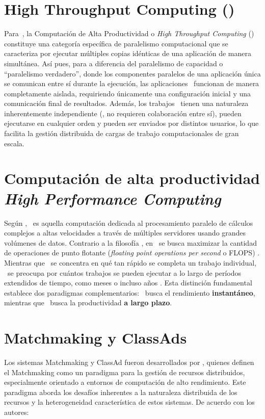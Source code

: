 \section{High Throughput Computing (\HTC)}
\noindent
Para~\cite{Morgan2009}, la Computación de Alta Productividad o \textit{High Throughput Computing} (\HTC) constituye una categoría específica de paralelismo computacional que se caracteriza por ejecutar múltiples copias idénticas de una aplicación de manera simultánea. Así pues, para \cite{Morgan2009} a diferencia del paralelismo de capacidad o ``paralelismo verdadero'', donde los componentes paralelos de una aplicación única se comunican entre sí durante la ejecución, las aplicaciones \HTC~funcionan de manera completamente aislada, requiriendo únicamente una configuración inicial y una comunicación final de resultados. Además, los trabajos \HTC~tienen una naturaleza inherentemente independiente (\ie, no requieren colaboración entre sí), pueden ejecutarse en cualquier orden y pueden ser enviados por distintos usuarios, lo que facilita la gestión distribuida de cargas de trabajo computacionales de gran escala.

\section{Computación de alta productividad \textit{High Performance Computing} \HPC}

\noindent
Según \cite{SK2023}, \HPC~es aquella computación dedicada al procesamiento paralelo de cálculos complejos a altas velocidades a través de múltiples servidores usando grandes volúmenes de datos. Contrario a la filosofía \HTC, en \HPC~se busca maximizar la cantidad de operaciones de punto flotante (\textit{floating point operations per second} o FLOPS) \citep{HTCondor-what-is-htc}. Mientras que \HPC~se concentra en qué tan rápido se completa un trabajo individual, \HTC~se preocupa por cuántos trabajos se pueden ejecutar a lo largo de períodos extendidos de tiempo, como meses o incluso años \citep{Raman1998}. Esta distinción fundamental establece dos paradigmas complementarios: \HPC~busca el rendimiento \textbf{instantáneo}, mientras que \HTC~busca la productividad \textbf{a largo plazo}.

\section{Matchmaking y ClassAds}
Los sistemas Matchmaking y ClassAd fueron desarrollados por \cite{Raman1998}, quienes definen el Matchmaking como un paradigma para la gestión de recursos distribuidos, especialmente orientado a entornos de computación de alto rendimiento. Este paradigma aborda los desafíos inherentes a la naturaleza distribuida de los recursos y la heterogeneidad característica de estos sistemas. De acuerdo con los autores:


